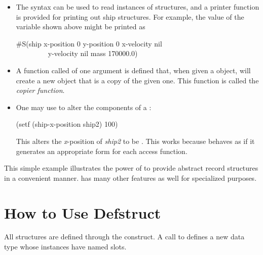 \begin{itemize}
\item
The  syntax can be used to read instances of 
structures, and a printer function is provided for printing
out ship structures.  For example, the value of the
variable  shown above might be printed as
\begin{lisp}
\#S(ship  x-position 0  y-position 0  x-velocity nil \\
~~~~~~~~~y-velocity nil  mass 170000.0)
\end{lisp}

\item
A function called  of one argument
is defined that, when given a  object,
will create a new  object that is a copy of the given one.
This function is called the {\it copier function}.

\item
One may use  to alter the components of a :
\begin{lisp}
(setf (ship-x-position ship2) 100)
\end{lisp}
This alters the {\it x}-position of {\it ship2} to be .
This works because  behaves as if
it generates an appropriate 
form for each access function.
\end{itemize}

This simple example illustrates the power of  to provide
abstract record structures in a convenient manner.
 has many other features as well for specialized purposes.

\section{How to Use Defstruct}

All structures are defined through the  construct.
A call to  defines a new data type whose instances
have named slots.

